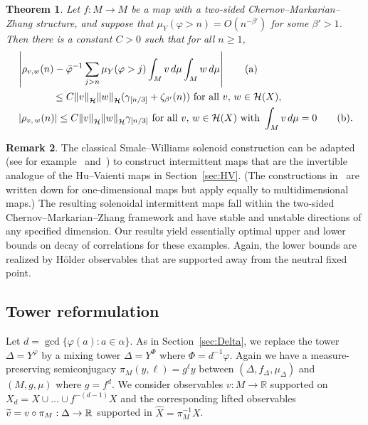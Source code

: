 \documentclass[10pt]{amsart}
\newtheorem{theo}{Theorem}[section]
\theoremstyle{definition}\newtheorem{defi}[theo]{Definition}\newtheorem{rema}[theo]{Remark}\newtheorem{exam}[theo]{Example}\newtheorem{exem}[theo]{Example}\newtheorem{nota}[theo]{Notation}
\newcommand{\R}{\mathbb{R}}
\newcommand{\cH}{\mathcal{H}}
\newcommand{\hX}{\widehat{X}}
\newcommand{\tv}{\tilde{v}}
\newcommand{\bvarphi}{\bar{\varphi}}
\newcommand*{\alphenumi}{\renewcommand*{\theenumi}{\alph{enumi}}}
\let\oldtilde\tilde
\renewcommand*{\tilde}[1]{\mathchoice{\widetilde{#1}}{\widetilde{#1}}{\oldtilde{#1}}{\oldtilde{#1}}}
\begin{document}
\begin{theo} \label{thm:main2}
Let $f:M\to M$ be a map with a two-sided Chernov--Marka\-rian--Zhang structure, and suppose that $\mu_Y(\varphi>n)=O(n^{-\beta'})$ for some $\beta'>1$. Then there is a constant $C>0$ such that for all $n\ge1$,
\begin{align}
&\left|\rho_{v,w}(n)-\bvarphi^{-1}\sum_{j>n} \mu_Y(\varphi>j)\int_Mv\,d\mu\int_Mw\,d\mu\right|\tag{${\rm a}$}\label{theo7.4.1}\\
&\mkern65mu\le C{\|v\|}_{\cH}{\|w\|}_{\cH}(\gamma_{[n/3]}+\zeta_{\beta'}(n))\text{ for all }v,\,w\in \cH(X),\nonumber\\
&\left|\rho_{v,\,w}(n)\right|\le C{\|v\|}_{\cH}{\|w\|}_\cH\gamma_{[n/3]}\text{ for all }v,\,w\in \cH(X)\text{ with }\int_M v\,d\mu=0\tag{${\rm b}$}\label{theo7.4.2}.
\end{align}
\end{theo}

\begin{rema}\label{rmk:NUH}
The classical Smale--Williams solenoid construction can be adap\-ted (see for example~\cite[Section~5]{AlvesPinheiro08} and~\cite[Example~4.2]{MV16}) to construct intermittent maps that are the invertible analogue of the Hu--Vaienti maps in Section~\ref{sec:HV}. (The constructions in~\cite{AlvesPinheiro08,MV16} are written down for one-dimensional maps but apply equally to multidimensional maps.) The resulting solenoidal intermittent maps fall within the two-sided Chernov--Markarian--Zhang framework and have stable and unstable directions of any specified dimension. Our results yield essentially optimal upper and lower bounds on decay of correlations for these examples. Again, the lower bounds are realized by H\"older observables that are supported away from the neutral fixed point.
\end{rema}


\subsection{Tower reformulation}\label{sec:Delta2}
Let $d=\gcd\{\varphi(a):a\in\alpha\}$. As in Section~\ref{sec:Delta}, we replace the tower $\Delta=Y^\varphi$ by a mixing tower $\Delta=Y^\Phi$ where $\Phi=d^{-1}\varphi$. Again we have a measure-preserving semiconjugacy $\pi_M(y,\ell)=g^\ell y$ between $(\Delta,f_\Delta,\mu_\Delta)$ and $(M,g,\mu)$ where $g=f^d$. We consider observables $v:M\to\R$ supported on $X_d=X\cup\dots\cup f^{-(d-1)}X$ and the corresponding lifted observables $\tv=v\circ\pi_M:\Delta\to\R$ supported in $\hX=\pi_M^{-1}X$.
\end{document}

